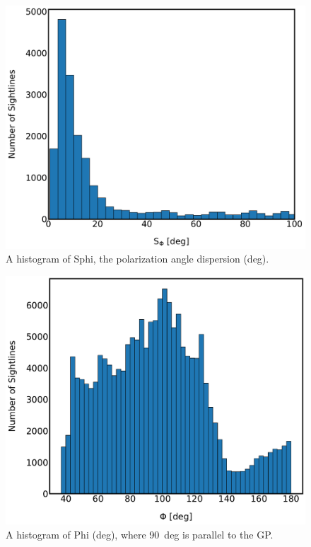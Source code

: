 \begin{figure}[!htbp]
\centering
\includegraphics[width=\textwidth]{figures/carina/S_hist}
\caption[~A histogram of the dispersion in polarization angle.]{A histogram of \gls{Sphi}, the polarization angle dispersion (deg).}
\label{fig:S_hist}
\end{figure}

\begin{figure}[!htbp]
\centering
\includegraphics[width=\textwidth]{figures/carina/Phi_hist}
\caption[~A histogram of the polarization angle.]{A histogram of \gls{Phi} (deg), where 90~deg is parallel to the GP.}
\label{fig:Phi_hist}
\end{figure}

